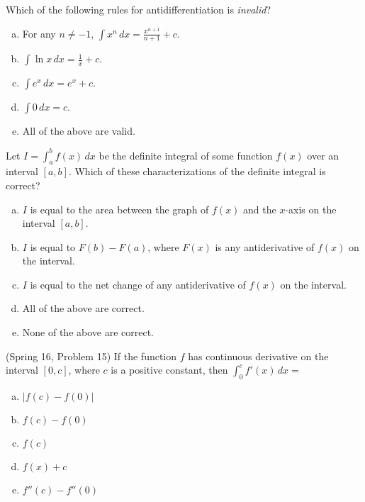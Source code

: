 \documentclass[12pt]{article}
\newcommand{\ds}{\displaystyle}
\newenvironment{problem}[2][Problem]{\begin{trivlist}
\item[\hskip \labelsep {\bfseries #1}\hskip \labelsep {\bfseries #2.}]}{\end{trivlist}}
\begin{document}
\vspace{1in}

\begin{problem}{5}
Which of the following rules for antidifferentiation is {\it invalid}? 
\begin{enumerate}[(a)]
  \item For any $n\not = -1$, $\ds\int\! x^{n}\, dx = \frac{x^{n + 1}}{n + 1} + c$. 
  \item $\ds\int\! \ln x\, dx = \frac{1}{x} + c$. 
  \item $\ds\int\! e^{x}\, dx = e^{x} + c$. 
  \item $\ds\int\! 0\, dx = c$. 
  \item All of the above are valid. 
\end{enumerate}
\end{problem}

\vspace{1in}

\begin{problem}{6}
Let $\ds I = \int_{a}^{b}\! f(x)\, dx$ be the definite integral of some function $f(x)$ over an interval $[a,b]$. Which of these characterizations of the definite integral is correct? 
\begin{enumerate}[(a)]
  \item $I$ is equal to the area between the graph of $f(x)$ and the $x$-axis on the interval $[a,b]$. 
  \item $I$ is equal to $F(b) - F(a)$, where $F(x)$ is any antiderivative of $f(x)$ on the interval. 
  \item $I$ is equal to the net change of any antiderivative of $f(x)$ on the interval. 
  \item All of the above are correct. 
  \item None of the above are correct. 
\end{enumerate}
\end{problem}

\newpage

\begin{problem}{7}
(Spring 16, Problem 15) If the function $f$ has continuous derivative on the interval $[0,c]$, where $c$ is a positive constant, then $\ds\int_{0}^{c}\! f'(x)\, dx = $
\begin{enumerate}[(a)]
  \item $|f(c) - f(0)|$
  \item $f(c) - f(0)$
  \item $f(c)$
  \item $f(x) + c$
  \item $f''(c) - f''(0)$
\end{enumerate}
\end{problem}
\end{document}
